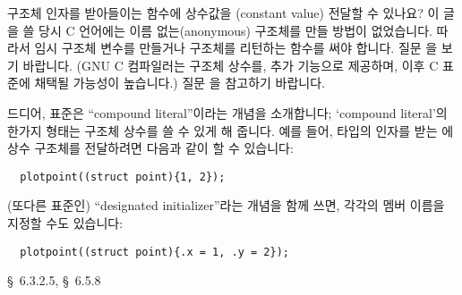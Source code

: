\begin{faq}
	구조체 인자를 받아들이는 함수에 상수값을 (constant value) 전달할 수 있나요?
\A
	이 글을 쓸 당시 C 언어에는 이름 없는(anonymous) 구조체를
	만들 방법이 없었습니다.  따라서 임시 구조체 변수를 만들거나 구조체를
	리턴하는 함수를 써야 합니다. 질문 을 보기 바랍니다.
        (GNU C 컴파일러는 구조체 상수를, 추가 기능으로 제공하며, 이후 C 표준에
        채택될 가능성이 높습니다.) 질문 을 참고하기 바랍니다.

	드디어, \cite{c9x} 표준은 ``compound literal''이라는 개념을 소개합니다;
	`compound literal'의 한가지 형태는 구조체 상수를 쓸 수 있게 해
	줍니다.  예를 들어,  타입의 인자를 받는
	에 상수 구조체를 전달하려면 다음과 같이 할 수 있습니다:
\begin{verbatim}
  plotpoint((struct point){1, 2});
\end{verbatim}

	(또다른 \cite{c9x} 표준인) ``designated initializer''라는 개념을 함께 쓰면,
	각각의 멤버 이름을 지정할 수도 있습니다:
\begin{verbatim}
  plotpoint((struct point){.x = 1, .y = 2});
\end{verbatim}

\R
	\cite{c9x} \S\ 6.3.2.5, \S\ 6.5.8
\end{faq}


